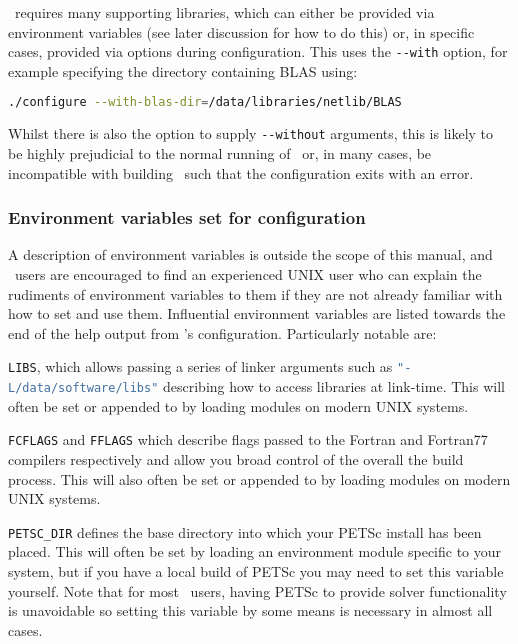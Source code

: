 \fluidity\ requires many supporting libraries, which can either be provided via
environment variables (see later discussion for how to do this) or, in specific
cases, provided via options during configuration. This uses the
\lstinline[language=Bash]+--with+ option, for example specifying the directory
containing BLAS using:

\begin{lstlisting}[language=Bash]
./configure --with-blas-dir=/data/libraries/netlib/BLAS
\end{lstlisting}

Whilst there is also the option to supply \lstinline[language=Bash]+--without+
arguments, this is likely to be highly prejudicial to the normal running of
\fluidity\ or, in many cases, be incompatible with building \fluidity\ such that
the configuration exits with an error.

\subsubsection{Environment variables set for configuration}
\label{sect:configure_environment_vars}

A description of environment variables is outside the scope of this manual, and
\fluidity\ users are encouraged to find an experienced UNIX user who can explain
the rudiments of environment variables to them if they are not already familiar
with how to set and use them. Influential environment variables are listed
towards the end of the help output from \fluidity's configuration. Particularly
notable are:

\lstinline[language=Bash]+LIBS+, which allows passing a series of linker
arguments such as \lstinline[language=Bash]+"-L/data/software/libs"+ describing
how to access libraries at link-time. This will often be set or appended to by
loading modules on modern UNIX systems.

\lstinline[language=Bash]+FCFLAGS+ and \lstinline[language=Bash]+FFLAGS+ which
describe flags passed to the Fortran and Fortran77 compilers respectively and
allow you broad control of the overall the build process. This will also often
be set or appended to by loading modules on modern UNIX systems.

\lstinline[language=Bash]+PETSC_DIR+ defines the base directory into which your
PETSc install has been placed. This will often be set by loading an environment
module specific to your system, but if you have a local build of PETSc you may
need to set this variable yourself. Note that for most \fluidity\ users, having
PETSc to provide solver functionality is unavoidable so setting this variable
by some means is necessary in almost all cases.

